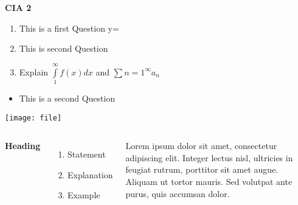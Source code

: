 \documentclass[10pt, a4paper]{article}
\begin{document}
\textbf{CIA 2}
\def\eq{y=}
\begin{enumerate}
    \item This is a first Question \eq
    \item This is second Question
    \item Explain $\int\limits_{1}^{\infty}f(x)dx$ and $\sum\limits{n=1}^{\infty} a_n$
\end{enumerate}
\begin{itemize}
    \item This is a second Question
\end{itemize}
\begin{center}
    \texttt{[image: file]}
\end{center}
\begin{columns}[c]
        \textbf{Heading}
        \begin{enumerate}
            \item Statement
            \item Explanation
            \item Example
        \end{enumerate}

        Lorem ipsum dolor sit amet, consectetur adipiscing elit. Integer lectus nisl, ultricies in feugiat rutrum, porttitor sit amet augue. Aliquam ut tortor mauris. Sed volutpat ante purus, quis accumsan dolor.

    \end{columns}
\end{document}
